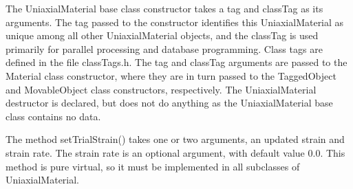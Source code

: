 \documentclass[12pt]{article}
\begin{document}
The UniaxialMaterial base class
constructor takes a tag and classTag as its arguments.
The tag passed to the constructor identifies this UniaxialMaterial
as unique among all other UniaxialMaterial objects, and the classTag is used primarily for
parallel processing and database programming. Class tags are defined in the file classTags.h.
The tag and classTag arguments are passed to the Material class constructor, where they
are in turn passed to the TaggedObject and MovableObject class constructors, respectively.
The UniaxialMaterial destructor is declared, but does not do anything as the UniaxialMaterial
base class contains no data.

The method setTrialStrain() takes one or two arguments, an updated strain
and strain rate. The strain rate is an optional argument, with default value $0.0$. This
method is pure virtual, so it must be implemented in all
subclasses of UniaxialMaterial.
\end{document}
